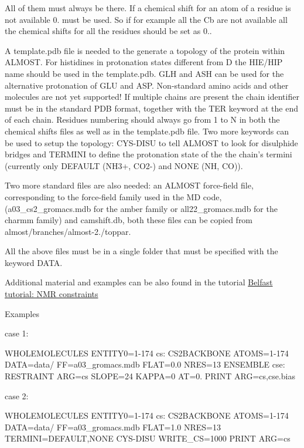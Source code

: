 All of them must always be there. If a chemical shift for an atom of a residue is not available 0. must be used. So if for example all the Cb are not available all the chemical shifts for all the residues should be set as 0..

A template.\+pdb file is needed to the generate a topology of the protein within A\+L\+M\+O\+S\+T. For histidines in protonation states different from D the H\+I\+E/\+H\+I\+P name should be used in the template.\+pdb. G\+L\+H and A\+S\+H can be used for the alternative protonation of G\+L\+U and A\+S\+P. Non-\/standard amino acids and other molecules are not yet supported! If multiple chains are present the chain identifier must be in the standard P\+D\+B format, together with the T\+E\+R keyword at the end of each chain. Residues numbering should always go from 1 to N in both the chemical shifts files as well as in the template.\+pdb file. Two more keywords can be used to setup the topology\+: C\+Y\+S-\/\+D\+I\+S\+U to tell A\+L\+M\+O\+S\+T to look for disulphide bridges and T\+E\+R\+M\+I\+N\+I to define the protonation state of the the chain's termini (currently only D\+E\+F\+A\+U\+L\+T (N\+H3+, C\+O2-\/) and N\+O\+N\+E (N\+H, C\+O)).

Two more standard files are also needed\+: an A\+L\+M\+O\+S\+T force-\/field file, corresponding to the force-\/field family used in the M\+D code, (a03\+\_\+cs2\+\_\+gromacs.\+mdb for the amber family or all22\+\_\+gromacs.\+mdb for the charmm family) and camshift.\+db, both these files can be copied from almost/branches/almost-\/2./toppar.

All the above files must be in a single folder that must be specified with the keyword D\+A\+T\+A.

Additional material and examples can be also found in the tutorial \hyperlink{belfast-9}{Belfast tutorial\+: N\+M\+R constraints}

\begin{DoxyParagraph}{Examples}

\end{DoxyParagraph}
case 1\+:

\begin{DoxyVerb}WHOLEMOLECULES ENTITY0=1-174
cs: CS2BACKBONE ATOMS=1-174 DATA=data/ FF=a03_gromacs.mdb FLAT=0.0 NRES=13 ENSEMBLE
cse: RESTRAINT ARG=cs SLOPE=24 KAPPA=0 AT=0.
PRINT ARG=cs,cse.bias
\end{DoxyVerb}


case 2\+:

\begin{DoxyVerb}WHOLEMOLECULES ENTITY0=1-174
cs: CS2BACKBONE ATOMS=1-174 DATA=data/ FF=a03_gromacs.mdb FLAT=1.0 NRES=13 TERMINI=DEFAULT,NONE CYS-DISU WRITE_CS=1000
PRINT ARG=cs
\end{DoxyVerb}



